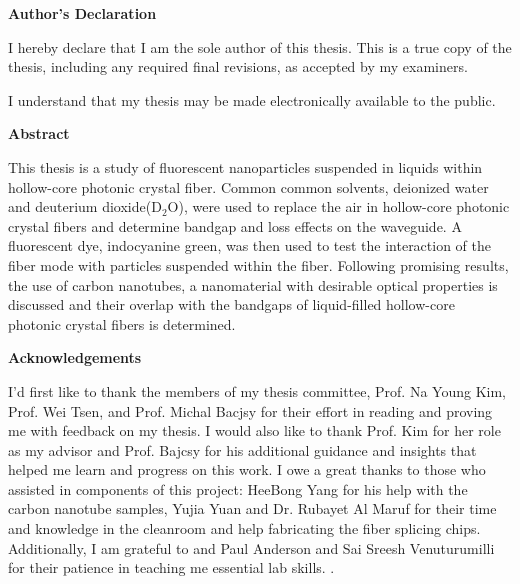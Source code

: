 \cleardoublepage %

 \begin{center}\textbf{Author's Declaration}\end{center}
  
 \noindent
I hereby declare that I am the sole author of this thesis. This is a true copy of the thesis, including any required final revisions, as accepted by my examiners.

  \bigskip
  
  \noindent
I understand that my thesis may be made electronically available to the public.

\cleardoublepage


\begin{center}\textbf{Abstract}\end{center}
This thesis is a study of fluorescent nanoparticles suspended in liquids within hollow-core photonic crystal fiber. Common  common solvents, deionized water and deuterium dioxide(D${}_2$O), were used to replace the air in hollow-core photonic crystal fibers and determine bandgap and loss effects on the waveguide. A fluorescent dye, indocyanine green, was then used to test the interaction of the fiber mode with particles suspended within the fiber. Following promising results, the use of carbon nanotubes, a nanomaterial with desirable optical properties is discussed and their overlap with the bandgaps of liquid-filled hollow-core photonic crystal fibers is determined. 

\cleardoublepage


\begin{center}\textbf{Acknowledgements}\end{center}
I'd first like to thank the members of my thesis committee, Prof. Na Young Kim, Prof. Wei Tsen, and Prof. Michal Bacjsy for their effort in reading and proving me with feedback on my thesis. I would also like to thank Prof. Kim for her role as my advisor and Prof. Bajcsy for his additional guidance and insights that helped me learn and progress on this work. I owe a great thanks to those who assisted in components of this project: HeeBong Yang for his help with the carbon nanotube samples, Yujia Yuan and Dr. Rubayet Al Maruf for their time and knowledge in the cleanroom and help fabricating the fiber splicing chips. Additionally, I am grateful to and Paul Anderson and Sai Sreesh Venuturumilli for their patience in teaching me essential lab skills.
.
\cleardoublepage

